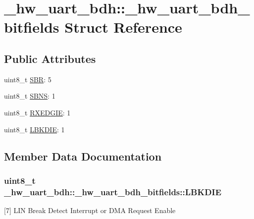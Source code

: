 \hypertarget{struct__hw__uart__bdh_1_1__hw__uart__bdh__bitfields}{}\section{\+\_\+hw\+\_\+uart\+\_\+bdh\+:\+:\+\_\+hw\+\_\+uart\+\_\+bdh\+\_\+bitfields Struct Reference}
\label{struct__hw__uart__bdh_1_1__hw__uart__bdh__bitfields}
\subsection*{Public Attributes}
\begin{DoxyCompactItemize}
\item 
uint8\+\_\+t \hyperlink{struct__hw__uart__bdh_1_1__hw__uart__bdh__bitfields_a59c3df1a48f979d34aa83cc9af8e18c4}{S\+BR}\+: 5
\item 
uint8\+\_\+t \hyperlink{struct__hw__uart__bdh_1_1__hw__uart__bdh__bitfields_a07344458bdf443f3fa8b9f75d1e415f3}{S\+B\+NS}\+: 1
\item 
uint8\+\_\+t \hyperlink{struct__hw__uart__bdh_1_1__hw__uart__bdh__bitfields_a7012b6f1b0f6bf33a07e4454cbb6a01f}{R\+X\+E\+D\+G\+IE}\+: 1
\item 
uint8\+\_\+t \hyperlink{struct__hw__uart__bdh_1_1__hw__uart__bdh__bitfields_a0a9a29b24c4f4ae25e99d08e1125076a}{L\+B\+K\+D\+IE}\+: 1
\end{DoxyCompactItemize}


\subsection{Member Data Documentation}
\subsubsection[{\texorpdfstring{L\+B\+K\+D\+IE}{LBKDIE}}]{\setlength{\rightskip}{0pt plus 5cm}uint8\+\_\+t \+\_\+hw\+\_\+uart\+\_\+bdh\+::\+\_\+hw\+\_\+uart\+\_\+bdh\+\_\+bitfields\+::\+L\+B\+K\+D\+IE}\hypertarget{struct__hw__uart__bdh_1_1__hw__uart__bdh__bitfields_a0a9a29b24c4f4ae25e99d08e1125076a}{}\label{struct__hw__uart__bdh_1_1__hw__uart__bdh__bitfields_a0a9a29b24c4f4ae25e99d08e1125076a}
\mbox{[}7\mbox{]} L\+IN Break Detect Interrupt or D\+MA Request Enable 
